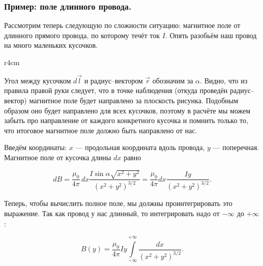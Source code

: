 \documentclass[a4paper,12pt]{article}
\begin{document}
\subsubsection{Пример: поле длинного провода.}
\label{sec:wire_current}

Рассмотрим теперь следующую по сложности ситуацию: магнитное поле от
длинного прямого провода, по которому течёт ток $I$. Опять разобьём
наш провод на много маленьких кусочков. 

\begin{wrapfigure}{r}{4cm}
\centering
{}
\label{fig:current_wire}
\end{wrapfigure}

Угол между кусочком $d\vec{l}$ и радиус--вектором $\vec{r}$ обозначим
за $\alpha$. Видно, что из правила правой руки следует, что в точке
наблюдения (откуда проведён радиус--вектор) магнитное поле будет
направлено за плоскость рисунка. Подобным образом оно будет направлено
для всех кусочков, поэтому в расчёте мы можем забыть про направление
от каждого конкретного кусочка и помнить только то, что итоговое
магнитное поле должно быть направлено от нас. 

Введём координаты: $x$ --- продольная координата вдоль провода,
$y$ --- поперечная. Магнитное поле от кусочка длины $dx$ равно

\begin{equation}
  \label{eq:wire_current_1}
  dB = \frac{\mu_{0}}{4\pi}\,dx \frac{I \sin \alpha
    \sqrt{x^2+y^2}}{\left(x^2+y^2\right)^{3/2}} = \frac{\mu_0}{4\pi} dx \frac{I
  y}{\left(x^2+y^2\right)^{3/2}}.
\end{equation}

Теперь, чтобы вычислить полное поле, мы должны проинтегрировать это
выражение. Так как провод у нас длинный, то интегрировать надо от
$-\infty$ до $+\infty$: 

\begin{equation}
  \label{eq:wire_current_2}
  B(y) = \frac{\mu_0}{4\pi} Iy \int\limits_{-\infty}^{+\infty} \frac{dx}{\left(x^2+y^2\right)^{3/2}} .
\end{equation}
\end{document}
